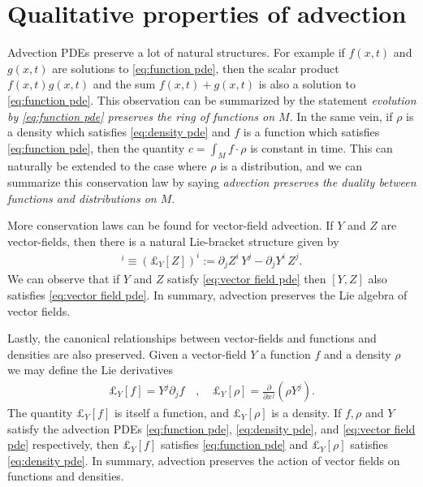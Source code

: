 \documentclass[12pt]{amsart}
\newcommand{\pder}[2]{\ensuremath{\frac{ \partial #1}{\partial #2}}}
\begin{document}
\section{Qualitative properties of advection}
\label{sec:properties}
Advection PDEs preserve a lot of natural structures.
For example if $f(x,t)$ and $g(x,t)$ are solutions to \eqref{eq:function pde}, then the scalar product $f(x,t) g(x,t)$  and the sum $f(x,t) + g(x,t)$ is also a solution to \eqref{eq:function pde}.
This observation can be summarized by the statement \emph{evolution by \eqref{eq:function pde} preserves the ring of functions on $M$}.
In the same vein, if $\rho$ is a density which satisfies \eqref{eq:density pde} and $f$ is a function which satisfies \eqref{eq:function pde}, then the quantity $c = \int_{M} f \cdot \rho$ is constant in time.
This can naturally be extended to the case where $\rho$ is a distribution, and we can summarize this conservation law by saying \emph{advection preserves the duality between functions and distributions on $M$}.

More conservation laws can be found for vector-field advection.
If $Y$ and $Z$ are vector-fields, then there is a natural Lie-bracket structure given by
\begin{align*}
	[Y,Z]^{i} \equiv ( \pounds_{Y}[Z] )^{i} := \partial_{j}Z^{i} \, Y^{j} - \partial_{j}Y^{i} \, Z^{j}.
\end{align*}
We can observe that if $Y$ and $Z$ satisfy \eqref{eq:vector field pde} then $[Y,Z]$ also satisfies \eqref{eq:vector field pde}.
In summary, advection preserves the Lie algebra of vector fields.

Lastly, the canonical relationships between vector-fields and functions and densities are also preserved.
Given a vector-field $Y$ a function $f$ and a density $\rho$ we may define the Lie derivatives
\begin{align*}
	\pounds_{Y}[f] = Y^{j} \partial_{j}f \quad , \quad \pounds_{Y}[\rho] = \pder{}{x^{j}} ( \rho Y^{j} ).
\end{align*}
The quantity $\pounds_{Y}[f]$ is itself a function, and $\pounds_{Y}[\rho]$ is a density.
If $f,\rho$ and $Y$ satisfy the advection PDEs \eqref{eq:function pde}, \eqref{eq:density pde}, and \eqref{eq:vector field pde} respectively,
then $\pounds_{Y}[f]$ satisfies \eqref{eq:function pde} and $\pounds_{Y}[\rho]$ satisfies \eqref{eq:density pde}.
In summary, advection preserves the action of vector fields on functions and densities.
\end{document}
